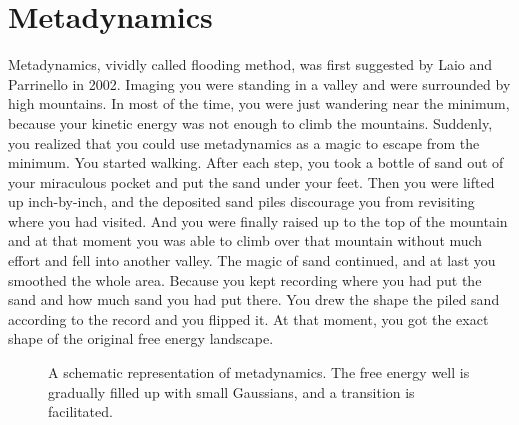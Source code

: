 \section{Metadynamics\label{Sec:ES:metadynamics}}
Metadynamics, vividly called flooding method, was first suggested by Laio and Parrinello in 2002.\cite{LaioPNAS2002} 
Imaging you were standing in a valley and were surrounded by high mountains. In most of the time, you were just wandering near the minimum, because your kinetic energy was not enough to climb the mountains. Suddenly, you realized that you could use metadynamics as a magic to escape from the minimum. You started walking. After each step, you took a bottle of sand out of your miraculous pocket and put the sand under your feet. Then you were lifted up inch-by-inch, and the deposited sand piles discourage you from revisiting where you had visited. And you were finally raised up to the top of the mountain and at that moment you was able to climb over that mountain without much effort and fell into another valley. The magic of sand continued, and at last you smoothed the whole area. Because you kept recording where you had put the sand and how much sand you had put there. You drew the shape the piled sand according to the record and you flipped it. At that moment, you got the exact shape of the original free energy landscape. 
\begin{figure}[htbp]
	\centering
	\caption{A schematic representation of metadynamics. The free energy well is gradually filled up with small Gaussians, and a transition is facilitated.}\label{Fig:ES:metadynamics}
\end{figure}

